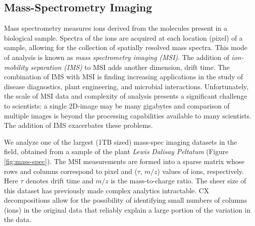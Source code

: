 \subsection{Mass-Spectrometry Imaging}
Mass spectrometry measures ions derived from the molecules present in a biological sample. Spectra of the ions are acquired at each location (pixel) of a sample, allowing for the collection of spatially resolved mass spectra. This mode of analysis is known as \textit{mass spectrometry imaging (MSI)}. The addition of \textit{ion-mobility separation (IMS)} to MSI adds another dimension, drift time.  The combination of IMS with MSI is finding increasing applications in the study of disease diagnostics, plant engineering, and microbial interactions. Unfortunately, the scale of MSI data and complexity of analysis presents a significant challenge to scientists: a single 2D-image may be many gigabytes and comparison of multiple images is beyond the processing capabilities available to many scientists. The addition of IMS exacerbates these problems. 

We analyze one of the largest (1TB sized) mass-spec imaging datasets in the field, obtained from a sample of the plant {\it Lewis Dalisay Peltatum} (Figure \ref{fig:mass-spec}). The MSI measurements are formed into a sparse matrix whose rows and columns correspond to pixel and ($\tau$, $m/z$) values of ions, respectively. Here $\tau$ denotes drift time and $m/z$ is the mass-to-charge ratio. The sheer size of this dataset has previously made complex analytics intractable. CX decompositions allow for the possibility of identifying small numbers of columns (ions) in the original data that reliably explain a large portion of the variation in the data.


